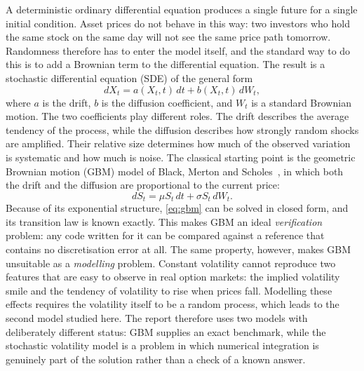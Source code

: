 \documentclass[11pt,a4paper]{article}
\theoremstyle{definition}
\theoremstyle{remark}
\begin{document}
A deterministic ordinary differential equation produces a single future for a single initial condition. Asset prices do not behave in this way: two investors who hold the same stock on the same day will not see the same price path tomorrow. Randomness therefore has to enter the model itself, and the standard way to do this is to add a Brownian term to the differential equation. The result is a stochastic differential equation (SDE) of the general form
\begin{equation}
    dX_t = a(X_t, t)\,dt + b(X_t, t)\,dW_t,
    \label{eq:general-sde}
\end{equation}
where $a$ is the drift, $b$ is the diffusion coefficient, and $W_t$ is a standard Brownian motion. The two coefficients play different roles. The drift describes the average tendency of the process, while the diffusion describes how strongly random shocks are amplified. Their relative size determines how much of the observed variation is systematic and how much is noise.
The classical starting point is the geometric Brownian motion (GBM) model of Black, Merton and Scholes~\cite{blackscholes}, in which both the drift and the diffusion are proportional to the current price:
\begin{equation}
    dS_t = \mu S_t\,dt + \sigma S_t\,dW_t .
    \label{eq:gbm}
\end{equation}
Because of its exponential structure, \eqref{eq:gbm} can be solved in closed form, and its transition law is known exactly. This makes GBM an ideal \emph{verification} problem: any code written for it can be compared against a reference that contains no discretisation error at all.
The same property, however, makes GBM unsuitable as a \emph{modelling} problem. Constant volatility cannot reproduce two features that are easy to observe in real option markets: the implied volatility smile and the tendency of volatility to rise when prices fall. Modelling these effects requires the volatility itself to be a random process, which leads to the second model studied here. The report therefore uses two models with deliberately different status: GBM supplies an exact benchmark, while the stochastic volatility model is a problem in which numerical integration is genuinely part of the solution rather than a check of a known answer.
\end{document}
